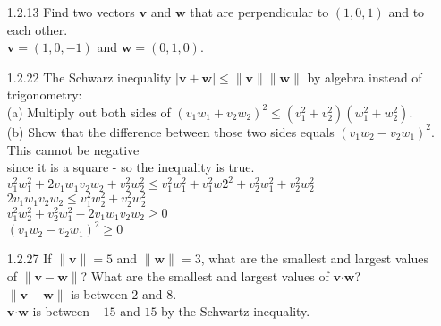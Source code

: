 \documentclass[10pt,twoside,reqno]{article}
\begin{document}
\begin{enumerate}
(b.) If $\pmb{u}$ is perpendicular to $\pmb{v}$ and $\pmb{w}$, then $\pmb{u}$ is perpendicular to $\pmb{v} + 2\pmb{w}$.\\
\vspace{2mm}
\hspace{6mm} True. $\pmb{u} \pmb{\cdot} (\pmb{v} + 2\pmb{w}) = \pmb{u} \pmb{\cdot} \pmb{v} + 2\pmb{u} \pmb{\cdot} \pmb{w} = 0$\\
\vspace{2mm}
(c.) If $\pmb{u}$ and $\pmb{v}$ are perpendicular unit vectors then $\lVert\pmb{u} - \pmb{v}\rVert = \sqrt{2}$\\
\vspace{2mm}
\hspace{6mm} True. $\lVert\pmb{u} - \pmb{v}\rVert^2 = (\pmb{u} - \pmb{v}) \pmb{\cdot} (\pmb{u} - \pmb{v} )$ seperates into $\pmb{u} \pmb{\cdot} \pmb{u} + \pmb{v} \pmb{\cdot} \pmb{v} = 2$ when $\pmb{u} \pmb{\cdot} \pmb{v} = \pmb{v} \pmb{\cdot} \pmb{u} = 0$\\
\vspace{2mm}
\item[1.2.13] Find two vectors $\pmb{v}$ and $\pmb{w}$ that are perpendicular to $(1, 0, 1)$ and to each other.\\
\vspace{3mm}
$\pmb{v} = (1, 0, -1)$ and $\pmb{w} = (0, 1, 0)$.\\
\vspace{5mm}
\item[1.2.22] The Schwarz inequality $|\pmb{v} + \pmb{w}| \leq \lVert \pmb{v} \rVert \lVert \pmb{w} \rVert$ by algebra instead of trigonometry:\\
(a) Multiply out both sides of $(v_{1}w_{1} + v_{2}w_{2})^2 \leq (v_{1}^2 + v_{2}^2)(w_{1}^2 + w_{2}^2)$.\\
(b) Show that the difference between those two sides equals $(v_{1}w_{2} - v_{2}w_{1})^2$. This cannot be negative\\
\hspace{5mm} since it is a square - so the inequality is true.\\
\vspace{3mm}
$v_{1}^2w_{1}^2 + 2v_{1}w_{1}v_{2}w_{2} + v_{2}^2w_{2}^2 \leq v_{1}^2w_{1}^2 + v_{1}^2w{2}^2 + v_{2}^2w_{1}^2 + v_{2}^2w_{2}^2$\\
$2v_{1}w_{1}v_{2}w_{2} \leq v_{1}^2w_{2}^2 + v_{2}^2w_{2}^2$\\
$v_{1}^2w_{2}^2 + v_{2}^2w_{1}^2 - 2v_{1}w_{1}v_{2}w_{2} \geq 0$\\
$(v_{1}w_{2} - v_{2}w_{1})^2 \geq 0$\\
\item[1.2.27] If $\lVert\pmb{v}\rVert = 5$ and $\lVert\pmb{w}\rVert = 3$, what are the smallest and largest values of $\lVert\pmb{v} - \pmb{w}\rVert$? What are the smallest and largest values of $\pmb{v} \pmb{\cdot} \pmb{w}$?\\
\vspace{3mm}
$\lVert\pmb{v} - \pmb{w}\rVert$ is between $2$ and $8$.\\
$\pmb{v}\pmb{\cdot}\pmb{w}$ is between $-15$ and $15$ by the Schwartz inequality.
\end{enumerate}
\end{document}
